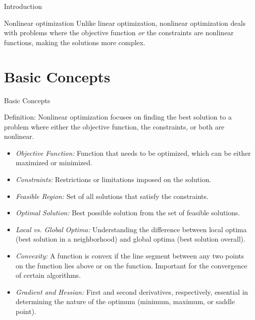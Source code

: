 \documentclass[
    NAME={Dr. Helga Ingimundardóttir},
    EMAIL={helgaingim@hi.is},
    FACULTY={Industrial Engineering},
    TITLE={Nonlinear Optimization},
    SUBTITLE={Approaches and Challenges},
    SEMINAR={VÉL113F},
    DATE={Design and Optimization}
]{../HI-latex/hi-beamer}
\begin{document}
    \begin{frame}{Introduction}
        \begin{block}{Nonlinear optimization}
            Unlike linear optimization, nonlinear optimization deals with problems where the objective function \emph{or}
            the constraints are nonlinear functions, making the solutions more complex.
        \end{block}
    \end{frame}


    \section{Basic Concepts}
    \begin{frame}{Basic Concepts}
        \begin{block}{Definition:}
            Nonlinear optimization focuses on finding the best solution to a problem where
            either the objective function, the constraints, or both are nonlinear.
        \end{block}
        \begin{itemize}

            \item \emph{Objective Function:} Function that needs to be optimized, which can be either maximized or
            minimized.

            \item \emph{Constraints:} Restrictions or limitations imposed on the solution.

            \item \emph{Feasible Region:} Set of all solutions that satisfy the constraints.

            \item \emph{Optimal Solution:} Best possible solution from the set of feasible solutions.

            \item \emph{Local vs. Global Optima:} Understanding the difference between local optima (best solution
            in a neighborhood) and global optima (best solution overall).

            \item \emph{Convexity:} A function is convex if the line segment between any two points on the function
            lies above or on the function. Important for the convergence of certain algorithms.

            \item \emph{Gradient and Hessian:} First and second derivatives, respectively, essential in determining
            the nature of the optimum (minimum, maximum, or saddle point).
        \end{itemize}
        \begin{figure}
            \centering
\end{figure}
\end{frame}
\end{document}
